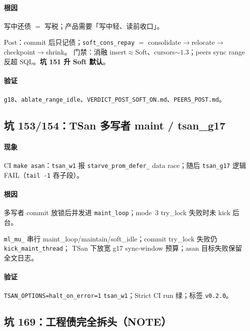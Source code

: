\paragraph{根因}
写中还债 $=$ 写税；产品需要「写中轻、读前收口」。

\begin{fixnew}
Post：commit 后只记债；\texttt{soft\_cons\_repay} $=$ consolidate$\to$relocate$\to$checkpoint$\to$shrink。
门禁：消融 insert$\approx$Soft、cursors$\sim 1.3$；peers sync range 反超 SQL。\textbf{坑 151 升 Soft 默认}。
\end{fixnew}

\paragraph{验证}
\texttt{g18}、\texttt{ablate\_range\_idle}、\texttt{VERDICT\_POST\_SOFT\_ON.md}、\texttt{PEERS\_POST.md}。

\subsection{坑 153/154：TSan 多写者 maint / tsan\_g17}
\paragraph{现象}
CI \texttt{make asan}：\texttt{tsan\_w1} 报 \texttt{starve\_prom\_defer\_} data race；随后 \texttt{tsan\_g17} 逻辑 FAIL（\texttt{tail -1} 吞子段）。

\paragraph{根因}
多写者 commit 放锁后并发进 \texttt{maint\_loop}；mode~3 try\_lock 失败时未 kick 后台。

\begin{fixnew}
\texttt{ml\_mu\_} 串行 maint\_loop/maintain/soft\_idle；commit try\_lock 失败仍 \texttt{kick\_maint\_thread}；
TSan 下放宽 g17 sync-window 预算；asan 目标失败保留全文日志。
\end{fixnew}

\paragraph{验证}
\texttt{TSAN\_OPTIONS=halt\_on\_error=1} \texttt{tsan\_w1}；Strict CI run 绿；标签 \texttt{v0.2.0}。

\subsection{坑 169：工程债完全拆头（NOTE）}
